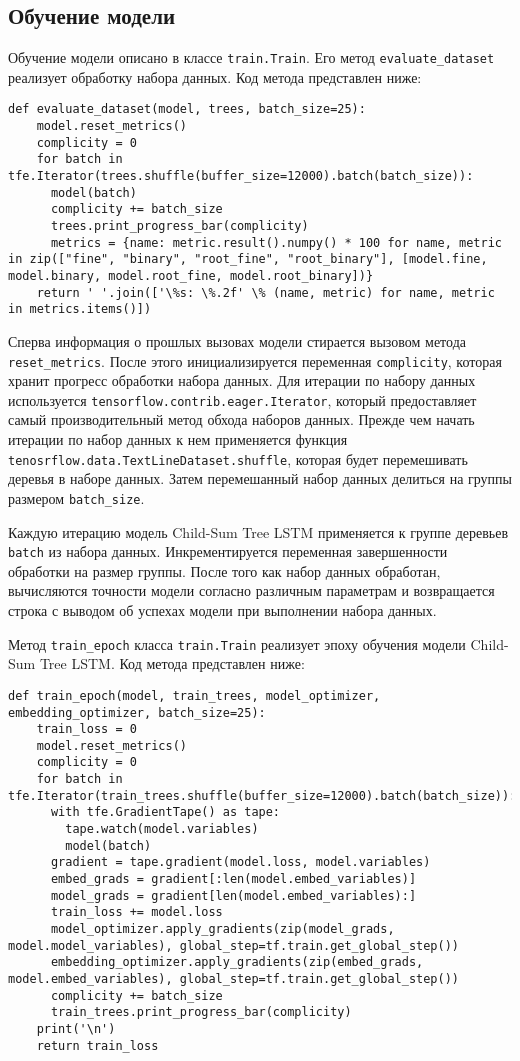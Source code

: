 \subsection{Обучение модели}
Обучение модели описано в классе \texttt{train.Train}. Его метод \texttt{eva\-lua\-te\_dataset} реализует обработку набора данных. Код метода представлен ниже:
\medskip
\begin{lstlisting}[style=Python]
  def evaluate_dataset(model, trees, batch_size=25):
    model.reset_metrics()
    complicity = 0
    for batch in tfe.Iterator(trees.shuffle(buffer_size=12000).batch(batch_size)):
      model(batch)
      complicity += batch_size
      trees.print_progress_bar(complicity)
      metrics = {name: metric.result().numpy() * 100 for name, metric in zip(["fine", "binary", "root_fine", "root_binary"], [model.fine, model.binary, model.root_fine, model.root_binary])}
    return ' '.join(['\%s: \%.2f' \% (name, metric) for name, metric in metrics.items()])
\end{lstlisting}
\medskip

Сперва информация о прошлых вызовах модели стирается вызовом метода \texttt{reset\_metrics}. После этого инициализируется переменная \texttt{comp\-licity}, которая хранит прогресс обработки набора данных. Для итерации по набору данных используется \texttt{tensorflow.contrib.eager.Iterat\-or}, который предоставляет самый производительный метод обхода наборов данных. Прежде чем начать итерации по набор данных к нем применяется функция \texttt{tenosr\-flow.data.TextLineDataset.shuffle}, которая будет перемешивать деревья в наборе данных. Затем перемешанный набор данных делиться на группы размером \texttt{batch\_size}.

Каждую итерацию модель Child-Sum Tree LSTM применяется к группе деревьев \texttt{batch} из набора данных. Инкрементируется переменная завершенности обработки на размер группы. После того как набор данных обработан, вычисляются точности модели согласно различным параметрам и возвращается строка с выводом об успехах модели при выполнении набора данных.

Метод \texttt{train\_epoch} класса \texttt{train.Train} реализует эпоху обучения модели Child-Sum Tree LSTM\@. Код метода представлен ниже:
\medskip
\begin{lstlisting}[style=Python]
  def train_epoch(model, train_trees, model_optimizer, embedding_optimizer, batch_size=25):
    train_loss = 0
    model.reset_metrics()
    complicity = 0
    for batch in tfe.Iterator(train_trees.shuffle(buffer_size=12000).batch(batch_size)):
      with tfe.GradientTape() as tape:
        tape.watch(model.variables)
        model(batch)
      gradient = tape.gradient(model.loss, model.variables)
      embed_grads = gradient[:len(model.embed_variables)]
      model_grads = gradient[len(model.embed_variables):]
      train_loss += model.loss
      model_optimizer.apply_gradients(zip(model_grads, model.model_variables), global_step=tf.train.get_global_step())
      embedding_optimizer.apply_gradients(zip(embed_grads, model.embed_variables), global_step=tf.train.get_global_step())
      complicity += batch_size
      train_trees.print_progress_bar(complicity)
    print('\n')
    return train_loss
\end{lstlisting}
\medskip

